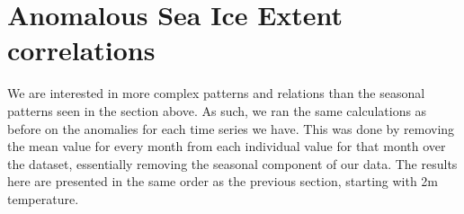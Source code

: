 \section{Anomalous Sea Ice Extent correlations}
We are interested in more complex patterns and relations than the seasonal patterns seen in the section above. As such, we ran the same calculations as before on the anomalies for each time series we have. This was done by removing the mean value for every month from each individual value for that month over the dataset, essentially removing the seasonal component of our data. The results here are presented in the same order as the previous section, starting with 2m temperature.


